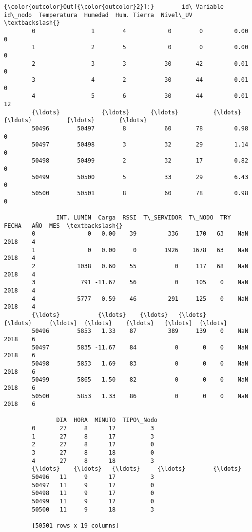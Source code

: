 \documentclass[11pt]{article}
\begin{document}
\begin{Verbatim}[commandchars=\\\{\}]
{\color{outcolor}Out[{\color{outcolor}2}]:}        id\_Variable  id\_nodo  Temperatura  Humedad  Hum. Tierra  Nivel\_UV  \textbackslash{}
        0                1        4            0        0         0.00         0   
        1                2        5            0        0         0.00         0   
        2                3        3           30       42         0.01         0   
        3                4        2           30       44         0.01         0   
        4                5        6           30       44         0.01        12   
        {\ldots}            {\ldots}      {\ldots}          {\ldots}      {\ldots}          {\ldots}       {\ldots}   
        50496        50497        8           60       78         0.98         0   
        50497        50498        3           32       29         1.14         0   
        50498        50499        2           32       17         0.82         0   
        50499        50500        5           33       29         6.43         0   
        50500        50501        8           60       78         0.98         0   
        
               INT. LUMÍN  Carga  RSSI  T\_SERVIDOR  T\_NODO  TRY  FECHA   AÑO  MES  \textbackslash{}
        0               0   0.00    39         336     170   63    NaN  2018    4   
        1               0   0.00     0        1926    1678   63    NaN  2018    4   
        2            1038   0.60    55           0     117   68    NaN  2018    4   
        3             791 -11.67    56           0     105    0    NaN  2018    4   
        4            5777   0.59    46         291     125    0    NaN  2018    4   
        {\ldots}           {\ldots}    {\ldots}   {\ldots}         {\ldots}     {\ldots}  {\ldots}    {\ldots}   {\ldots}  {\ldots}   
        50496        5853   1.33    87         389     139    0    NaN  2018    6   
        50497        5835 -11.67    84           0       0    0    NaN  2018    6   
        50498        5853   1.69    83           0       0    0    NaN  2018    6   
        50499        5865   1.50    82           0       0    0    NaN  2018    6   
        50500        5853   1.33    86           0       0    0    NaN  2018    6   
        
               DIA  HORA  MINUTO  TIPO\_Nodo  
        0       27     8      17          3  
        1       27     8      17          3  
        2       27     8      17          0  
        3       27     8      18          0  
        4       27     8      18          3  
        {\ldots}    {\ldots}   {\ldots}     {\ldots}        {\ldots}  
        50496   11     9      17          3  
        50497   11     9      17          0  
        50498   11     9      17          0  
        50499   11     9      17          0  
        50500   11     9      18          3  
        
        [50501 rows x 19 columns]
\end{Verbatim}
            
\end{document}
